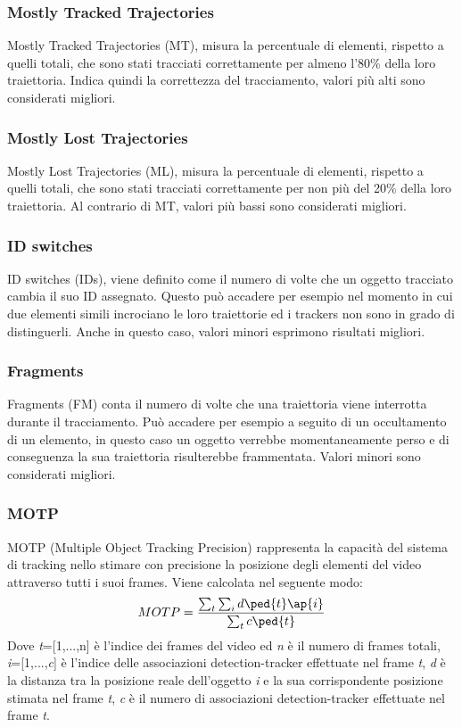 \subsubsection{Mostly Tracked Trajectories}
Mostly Tracked Trajectories (MT), misura la percentuale di elementi, rispetto a quelli totali, che sono stati tracciati correttamente per almeno l'80\% della loro traiettoria. Indica quindi la correttezza del tracciamento, valori più alti sono considerati migliori.
\subsubsection{Mostly Lost Trajectories}
Mostly Lost Trajectories (ML), misura la percentuale di elementi, rispetto a quelli totali, che sono stati tracciati correttamente per non più del 20\% della loro traiettoria. Al contrario di MT, valori più bassi sono considerati migliori.
\subsubsection{ID switches}
ID switches (IDs), viene definito come il numero di volte che un oggetto tracciato cambia il suo ID assegnato. Questo può accadere per esempio nel momento in cui due elementi simili incrociano le loro traiettorie ed i trackers non sono in grado di distinguerli. Anche in questo caso, valori minori esprimono risultati migliori.
\subsubsection{Fragments}
Fragments (FM) conta il numero di volte che una traiettoria viene interrotta durante il tracciamento. Può accadere per esempio a seguito di un occultamento di un elemento, in questo caso un oggetto verrebbe momentaneamente perso e di conseguenza la sua traiettoria risulterebbe frammentata. Valori minori sono considerati migliori. 
\subsubsection{MOTP}
MOTP (Multiple Object Tracking Precision) rappresenta la capacità del sistema di tracking nello stimare con precisione la posizione degli elementi del video attraverso tutti i suoi frames. Viene calcolata nel seguente modo:
\[
MOTP = \frac{\sum_{t}^{}\sum_{i}^{}d\ped{t}\ap{i}}{\sum_{t}^{}c\ped{t}}
\]
Dove \textit{t}=[1,...,n] è l'indice dei frames del video ed \textit{n} è il numero di frames totali, \textit{i}=[1,...,\textit{c}] è l'indice delle associazioni detection-tracker effettuate nel frame \textit{t}, \textit{d} è la distanza tra la posizione reale dell'oggetto \textit{i} e la sua corrispondente posizione stimata nel frame \textit{t}, \textit{c} è il numero di associazioni detection-tracker effettuate nel frame \textit{t}.
